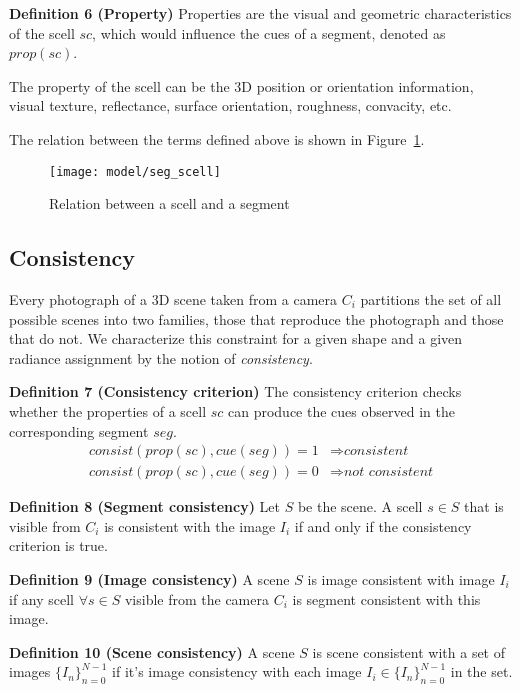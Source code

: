\noindent\textbf{Definition 6 (Property)} Properties are the visual and geometric characteristics of the scell $sc$, which would influence the cues of a segment, denoted as $prop(sc)$.

The property of the scell can be the 3D position or orientation information, visual texture, reflectance, surface orientation, roughness, convacity, etc.

The relation between the terms defined above is shown in Figure~\ref{fig:scell_seg}.
\begin{figure}[!htbp]
\centering
\texttt{[image: model/seg\_scell]}
\caption{Relation between a scell and a segment}
\label{fig:scell_seg}
\end{figure}


\subsection{Consistency}
Every photograph of a 3D scene taken from a camera $C_i$ partitions the set of all possible scenes into two families, those that reproduce the photograph and those that do not. We characterize this constraint for a given shape and a given radiance assignment by the notion of \textit{consistency}.

\noindent\textbf{Definition 7 (Consistency criterion)} The consistency criterion checks whether the properties of a scell $sc$ can produce the cues observed in the corresponding segment $seg$.
\begin{align*}
consist(prop(sc), cue(seg)) = 1 &\Rightarrow \textit{consistent}\\
consist(prop(sc), cue(seg)) = 0 &\Rightarrow \textit{not consistent}
\end{align*}

\noindent\textbf{Definition 8 (Segment consistency)} Let $S$ be the scene. A scell $s\in S$ that is visible from $C_i$ is consistent with the image $I_i$ if and only if the consistency criterion is true.

\noindent\textbf{Definition 9 (Image consistency)} A scene $S$ is image consistent with image $I_i$ if any scell $\forall s\in S$ visible from the camera $C_i$ is segment consistent with this image.

\noindent\textbf{Definition 10 (Scene consistency)} A scene $S$ is scene consistent with a set of images $\{I_n\}_{n=0}^{N-1}$ if it's image consistency with each image $I_i\in \{I_n\}_{n=0}^{N-1}$ in the set.

